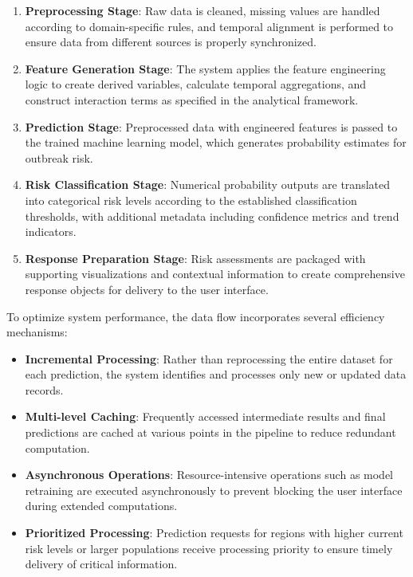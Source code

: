 \documentclass[12pt,a4paper]{report}
\begin{document}
\begin{enumerate}
    \item \textbf{Preprocessing Stage}: Raw data is cleaned, missing values are handled according to domain-specific rules, and temporal alignment is performed to ensure data from different sources is properly synchronized.
    
    \item \textbf{Feature Generation Stage}: The system applies the feature engineering logic to create derived variables, calculate temporal aggregations, and construct interaction terms as specified in the analytical framework.
    
    \item \textbf{Prediction Stage}: Preprocessed data with engineered features is passed to the trained machine learning model, which generates probability estimates for outbreak risk.
    
    \item \textbf{Risk Classification Stage}: Numerical probability outputs are translated into categorical risk levels according to the established classification thresholds, with additional metadata including confidence metrics and trend indicators.
    
    \item \textbf{Response Preparation Stage}: Risk assessments are packaged with supporting visualizations and contextual information to create comprehensive response objects for delivery to the user interface.
\end{enumerate}

To optimize system performance, the data flow incorporates several efficiency mechanisms:

\begin{itemize}
    \item \textbf{Incremental Processing}: Rather than reprocessing the entire dataset for each prediction, the system identifies and processes only new or updated data records.
    
    \item \textbf{Multi-level Caching}: Frequently accessed intermediate results and final predictions are cached at various points in the pipeline to reduce redundant computation.
    
    \item \textbf{Asynchronous Operations}: Resource-intensive operations such as model retraining are executed asynchronously to prevent blocking the user interface during extended computations.
    
    \item \textbf{Prioritized Processing}: Prediction requests for regions with higher current risk levels or larger populations receive processing priority to ensure timely delivery of critical information.
\end{itemize}
\end{document}
